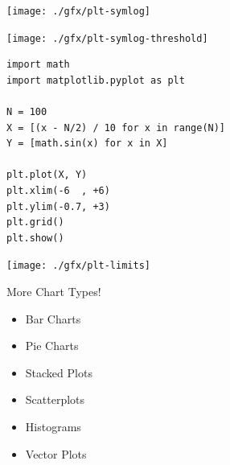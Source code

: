 
\begin{frame}[fragile]
%
\begin{tcbraster}[raster columns=2,
                  raster equal height,
                  nobeforeafter,
                  raster column skip=0.5cm]
\begin{tcolorbox}[title=symlog{,} default threshold]
	\texttt{[image: ./gfx/plt-symlog]}
\end{tcolorbox}
%
\begin{tcolorbox}[title=symlog{,} explicit threshold]
	\texttt{[image: ./gfx/plt-symlog-threshold]}
\end{tcolorbox}
\end{tcbraster}
%
\end{frame}


\begin{frame}[fragile]
%
\begin{codebox}[Example: Manually Scaled Axes, width=.53\linewidth, nobeforeafter, equal height group = grpXmpSimplePlotScale]
\begin{verbatim}
import math
import matplotlib.pyplot as plt

N = 100
X = [(x - N/2) / 10 for x in range(N)]
Y = [math.sin(x) for x in X]

plt.plot(X, Y)
plt.xlim(-6  , +6)
plt.ylim(-0.7, +3)
plt.grid()
plt.show()
\end{verbatim}
\end{codebox}
%
\begin{tcolorbox}[title=Output: Manually Scaled Axes, width=.45\linewidth, nobeforeafter, equal height group = grpXmpSimplePlotScale]
	\texttt{[image: ./gfx/plt-limits]}
\end{tcolorbox}
%
\end{frame}


\begin{frame}{More Chart Types!}
%
\begin{itemize}
\item Bar Charts
\item Pie Charts
\item Stacked Plots
\item Scatterplots
\item Histograms
\item Vector Plots
\end{itemize}
%
\end{frame}


